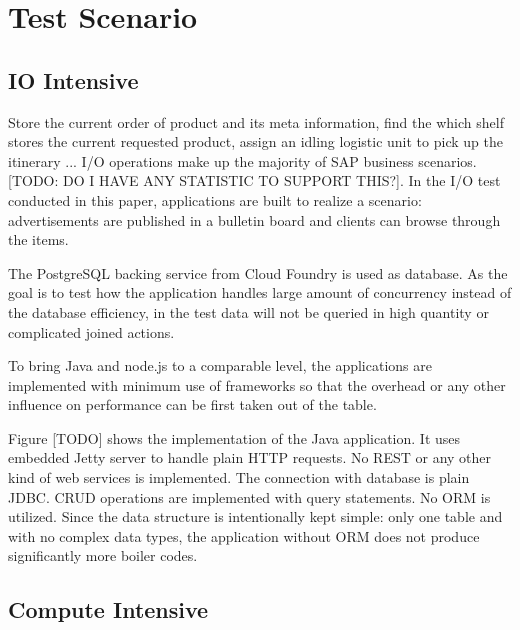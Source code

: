 \chapter{Test Scenario}
\section{IO Intensive}
Store the current order of product and its meta information, find the which shelf stores the current requested product, assign an idling logistic unit to pick up the itinerary ... I/O operations make up the majority of SAP business scenarios.  [TODO: DO I HAVE ANY STATISTIC TO SUPPORT THIS?]. In the I/O test conducted in this paper, applications are built to realize a scenario: advertisements are published in a bulletin board and clients can browse through the items. 

The PostgreSQL backing service from Cloud Foundry is used as database. As the goal is to test how the application handles large amount of concurrency instead of the database efficiency, in the test data will not be queried in high quantity or complicated joined actions. 

To bring Java and node.js to a comparable level, the applications are implemented with minimum use of frameworks so that the overhead or any other influence on performance can be first taken out of the table. 

Figure [TODO] shows the implementation of the Java application. It uses embedded Jetty server to handle plain HTTP requests. No REST or any other kind of web services is implemented. The connection with database is plain JDBC. CRUD operations are implemented with query statements. No ORM is utilized. Since the data structure is intentionally kept simple: only one table and with no complex data types, the application without ORM does not produce significantly more boiler codes. 

     
\section{Compute Intensive}
